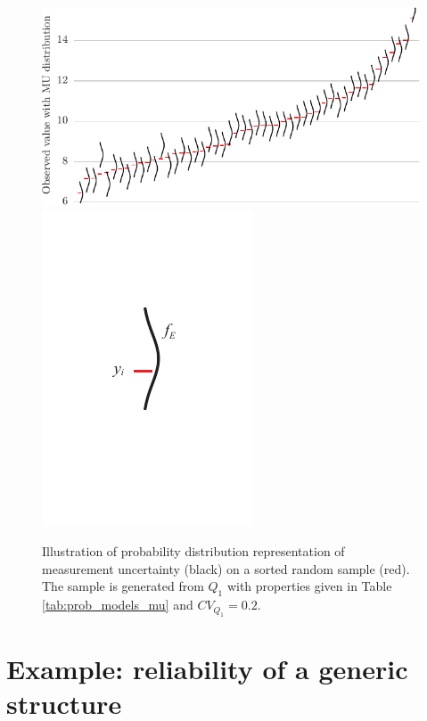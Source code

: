\begin{figure}[htbp!] 
	\centering    
	\includegraphics[]{obs_with_prob_error.pdf}
	\includegraphics[]{MU_prob_distr.pdf}
	\caption{Illustration of probability distribution representation of measurement uncertainty (black) on a sorted random sample (red). The sample is generated from $Q_1$ with properties given in Table \ref{tab:prob_models_mu} and $CV_{Q_1} = 0.2$.}
	\label{fig:obs_with_prob_error}
\end{figure}

\section{Example: reliability of a generic structure}

